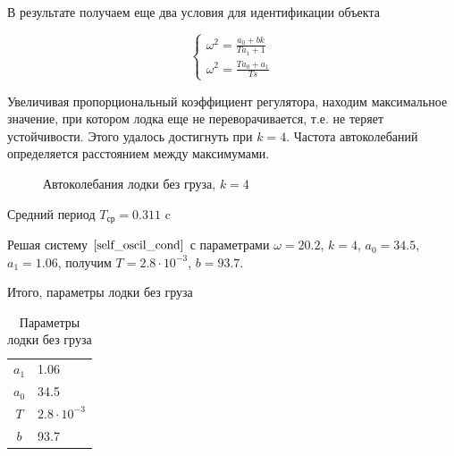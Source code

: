 \documentclass[a4paper]{article}
\begin{document}
В результате получаем еще два условия для идентификации объекта

\begin{equation*}
	\label{self_oscil_cond}
	\begin{cases}
		\omega^2 = \frac{a_0 + bk}{Ta_1 + 1}
		\\
		\omega^2 = \frac{Ta_0+a_1}{Ts}
	\end{cases}
\end{equation*}

Увеличивая пропорциональный коэффициент регулятора, находим максимальное значение, при котором лодка еще не переворачивается, т.е. не теряет устойчивости. Этого удалось достигнуть при $k = 4$. Частота автоколебаний определяется расстоянием между максимумами.

\begin{figure}[h]
	\caption{Автоколебания лодки без груза, $k = 4$}
\end{figure}

Средний период $T_{\text{ср}} = 0.311$ c

Решая систему $\ref{self_oscil_cond}$ с параметрами $\omega = 20.2$, $k = 4$, $a_0 = 34.5$, $a_1 = 1.06$, получим $T = 2.8 \cdot 10^{-3}$, $b = 93.7$.

Итого, параметры лодки без груза 

\begin{table}[h]
	\caption{Параметры лодки без груза}
	\label{table:boat_params_no_cargo}
	\begin{center}
		\begin{tabular}{cl}
			$a_1$ &  1.06 \\
			$a_0$ &  34.5 \\
			$T$ & $2.8 \cdot 10^{-3}$ \\
			$b$ & 93.7 \\
		\end{tabular}
	\end{center}
\end{table}
\end{document}
